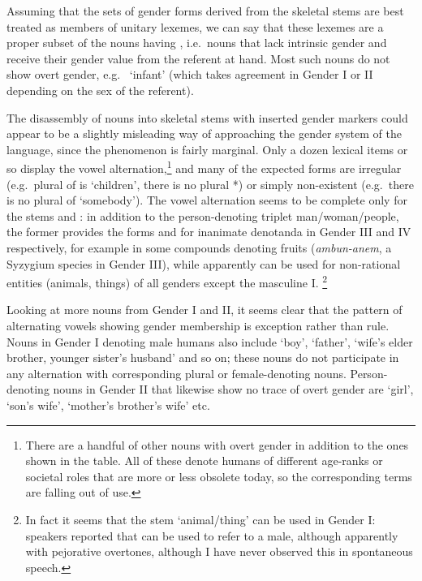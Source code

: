\documentclass[output=collectionpaper]{langsci/langscibook}
\begin{document}
Assuming that the sets of gender forms derived from the skeletal stems are best treated as members of unitary lexemes, we can say that these lexemes are a proper subset of the nouns having  \citep{Dahl2000a}, i.e.\ nouns that lack intrinsic gender and receive their gender value from the referent at hand. Most such nouns do not show overt gender, e.g.\  `infant' (which takes agreement in Gender I or II depending on the sex of the referent).


The disassembly of  nouns into skeletal stems with inserted gender markers could appear to be a slightly misleading way of approaching the gender system of the language, since the phenomenon is fairly marginal. Only a dozen lexical items or so display the vowel alternation,\footnote{There are a handful of other nouns with overt gender in addition to the ones shown in the table. All of these denote humans of different age-ranks or societal roles that are more or less obsolete today, so the corresponding terms are falling out of use.} and many of the expected forms are irregular (e.g.\ plural of  is  `children', there is no plural *) or simply non-existent (e.g.\ there is no plural of  `somebody'). The vowel alternation seems to be complete only for the stems  and : in addition to the person-denoting triplet man/woman/people, the former provides the forms  and  for inanimate denotanda in Gender III and IV respectively, for example in some compounds denoting fruits (\textit{ambun\hyp{}anem}, a Syzygium species in Gender III), while  apparently can be used for non-rational entities (animals, things) of all genders except the masculine I.%
\footnote{In fact it seems that the stem  `animal/thing' can be used in Gender I: speakers reported that  can be used to refer to a male, although apparently with pejorative overtones, although I have never observed this in spontaneous speech.}


Looking at more nouns from Gender I and II, it seems clear that the pattern of alternating vowels showing gender membership is exception rather than rule. Nouns in Gender I denoting male humans also include  `boy',  `father',  `wife's elder brother, younger sister's husband' and so on; these nouns do not participate in any alternation with corresponding plural or female-denoting nouns. %
Person-denoting nouns in Gender II that likewise show no trace of overt gender are  `girl',  `son's wife',  `mother's brother's wife' etc.
\end{document}
